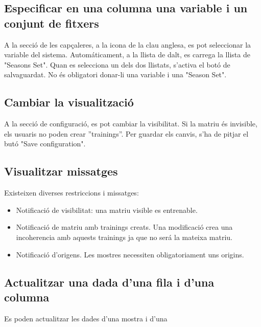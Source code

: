 \begin{itemize}
\subsection{Especificar en una columna una variable i un conjunt de fitxers}
A la secci\'{o} de les capçaleres, a la icona de la clau anglesa, es pot seleccionar la variable del sistema. Autom\'{a}ticament, a la llista de dalt, es carrega la llista de "Seasons Set". Quan es selecciona un dels dos llistats, s'activa el bot\'{o} de salvaguardat. No \'{e}s obligatori donar-li una variable i una "Season Set".

\subsection{Cambiar la visualitzaci\'{o}}
A la secci\'{o} de configuraci\'{o}, es pot cambiar la visibilitat. Si la matriu \'{e}s invisible, els usuaris no poden crear ''trainings''. Per guardar els canvis, s'ha de pitjar el but\'{o} "Save configuration".

\subsection{Visualitzar missatges}
Existeixen diverses restriccions i missatges:
\begin{itemize}
\item Notificaci\'{o} de visibilitat: una matriu visible es entrenable. 
\item Notificaci\'{o} de matriu amb trainings creats. Una modificaci\'{o} crea una incoherencia amb aquests trainings ja que no ser\'{a} la mateixa matriu.
\item Notificaci\'{o} d'origens. Les mostres necessiten obligatoriament uns origins.
\end{itemize}

\subsection{Actualitzar una dada d'una fila i d'una columna}
Es poden actualitzar les dades d'una mostra i d'una 


\end{itemize}
